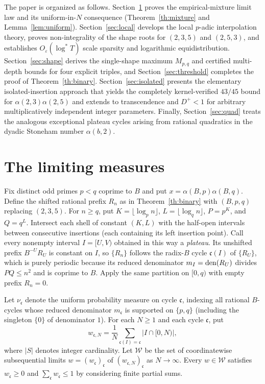 \documentclass[11pt]{article}
\begin{document}
The paper is organized as follows. Section~\ref{sec:mixture} proves the empirical-mixture limit law and its uniform-in-$N$ consequence (Theorem~\ref{th:mixture} and Lemma~\ref{lem:uniform}). Section~\ref{sec:local} develops the local $p$-adic interpolation theory, proves non-integrality of the shape roots for $(2,3,5)$ and $(2,5,3)$, and establishes $O_\varepsilon(\log^* T)$ scale sparsity and logarithmic equidistribution. Section~\ref{sec:shape} derives the single-shape maximum $M_{p,q}$ and certified multi-depth bounds for four explicit triples, and Section~\ref{sec:threshold} completes the proof of Theorem~\ref{th:binary}. Section~\ref{sec:isolated} presents the elementary isolated-insertion approach that yields the completely kernel-verified $43/45$ bound for $\alpha(2,3)\alpha(2,5)$ and extends to transcendence and $D^+<1$ for arbitrary multiplicatively independent integer parameters. Finally, Section~\ref{sec:quad} treats the analogous exceptional plateau cycles arising from rational quadratics in the dyadic Stoneham number $\alpha(b,2)$.

\section{The limiting measures}\label{sec:mixture}
Fix distinct odd primes $p<q$ coprime to $B$ and put $x=\alpha(B,p)\alpha(B,q)$. Define the shifted rational prefix $R_n$ as in Theorem~\ref{th:binary} with $(B,p,q)$ replacing $(2,3,5)$. For $n\ge q$, put $K=\lfloor\log_p n\rfloor$, $L=\lfloor\log_q n\rfloor$, $P=p^K$, and $Q=q^L$. Intersect each shell of constant $(K,L)$ with the half-open intervals between consecutive insertions (each containing its left insertion point). Call every nonempty interval $I=[U,V)$ obtained in this way a \emph{plateau}. Its unshifted prefix $B^{-U}R_U$ is constant on $I$, so $\{R_n\}$ follows the radix-$B$ cycle $\mathfrak c(I)$ of $\{R_U\}$, which is purely periodic because its reduced denominator $m_I=\operatorname{den}(R_U)$ divides $PQ\le n^2$ and is coprime to $B$. Apply the same partition on $[0,q)$ with empty prefix $R_n=0$.

Let $\nu_{\mathfrak c}$ denote the uniform probability measure on cycle $\mathfrak c$, indexing all rational $B$-cycles whose reduced denominator $m_{\mathfrak c}$ is supported on $\{p,q\}$ (including the singleton $\{0\}$ of denominator $1$). For each $N\ge1$ and each cycle $\mathfrak c$, put
\[
 w_{\mathfrak c,N}=\frac1N\sum_{\mathfrak c(I)=\mathfrak c}\bigl|I\cap[0,N)\bigr|,
\]
where $|S|$ denotes integer cardinality. Let $\mathcal W$ be the set of coordinatewise subsequential limits $w=(w_{\mathfrak c})_{\mathfrak c}$ of $(w_{\mathfrak c,N})_{\mathfrak c}$ as $N\to\infty$. Every $w\in\mathcal W$ satisfies $w_{\mathfrak c}\ge0$ and $\sum_{\mathfrak c} w_{\mathfrak c}\le1$ by considering finite partial sums.
\end{document}
